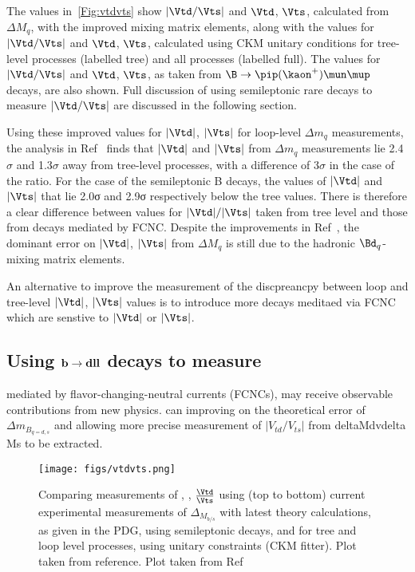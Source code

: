 The values in~\autoref{Fig:vtdvts} show $|\Vtd/\Vts|$ and $\Vtd$, $\Vts$, calculated from $\Delta M_{q}$, with the improved mixing matrix elements, along with the values for $|\Vtd/\Vts|$ and $\Vtd$, $\Vts$, calculated using CKM unitary conditions for tree-level processes (labelled tree) and all processes (labelled full). The values for $|\Vtd/\Vts|$ and $\Vtd$, $\Vts$, as taken from $\B\to\pip(\kaon^{+})\mun\mup$ decays, are also shown. Full discussion of using semileptonic rare decays to measure $|\Vtd/\Vts|$ are discussed in the following section.    %

Using these improved values for $|\Vtd|$, $|\Vts|$ for loop-level $\Delta m_{q}$ measurements, the analysis in Ref~\cite{vtdvts} finds that $|\Vtd|$ and $|\Vts|$ from $\Delta m_{q}$ measurements lie 2.4$\sigma$ and 1.3$\sigma$ away from tree-level processes, with a difference of 3$\sigma$ in the case of the ratio. For the case of the semileptonic B decays, the values of $|\Vtd|$ and $|\Vts|$ that lie  2.0σ and 2.9σ respectively below the tree values. 
There is therefore a clear difference between values for $|\Vtd|/|\Vts|$ taken from tree level and those from decays mediated by FCNC. Despite the improvements in Ref~\cite{vtdvts}, the dominant error on $|\Vtd|$, $|\Vts|$ from $\Delta M_{q}$ is still due to the hadronic $\Bd_{q}$-mixing matrix elements.

An alternative to improve the measurement of the discpreancpy between loop and tree-level $|\Vtd|$, $|\Vts|$ values is to introduce more decays meditaed via FCNC which are senstive to $|\Vtd|$ or $|\Vts|$.

\subsection{Using $\bf{b\to dll}$ decays to measure }

mediated by flavor-changing-neutral currents (FCNCs), may receive observable contributions
from new physics.
can improving on the
theoretical error of $\Delta m_{B_{q = d,s}}$ and allowing more precise measurement of $|V_{td}/V_{ts}|$ from deltaMdvdelta Ms to be extracted.

\begin{figure}
\texttt{[image: figs/vtdvts.png]}
\caption{Comparing measurements of \Vtd, \Vts, $\frac{\Vtd}{\Vts}$ using (top to bottom) current experimental measurements of $\Delta_{M_{b/s}}$ with latest theory calculations, as given in the PDG,  using semileptonic decays, and for tree and loop level processes, using unitary constraints (CKM fitter). Plot taken from reference. Plot taken from Ref~\cite{vtdvts}}
\label{Fig:vtdvts}
\end{figure}
 
